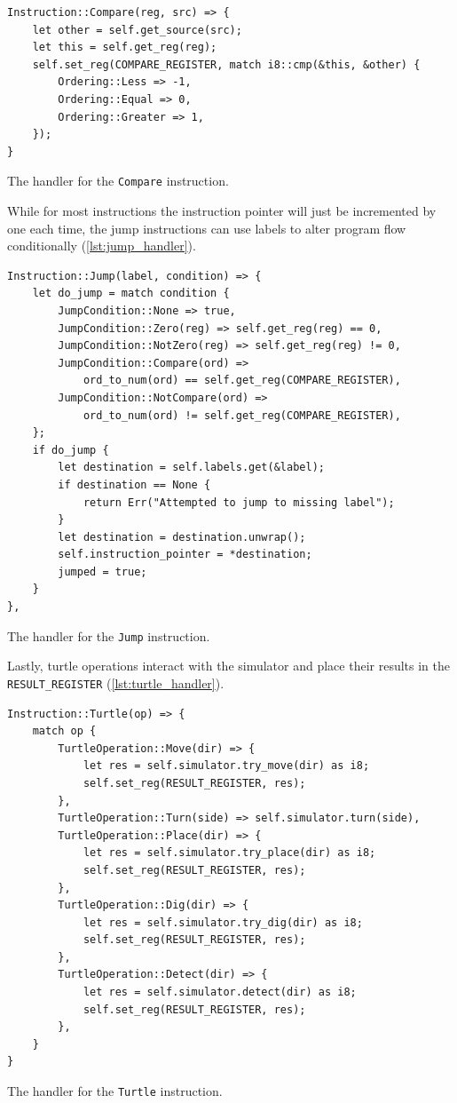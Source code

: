 \documentclass{report}
\newenvironment{code}{\captionsetup{type=listing}}{}
\begin{document}
\begin{code}
    \begin{verbatim}
Instruction::Compare(reg, src) => {
    let other = self.get_source(src);
    let this = self.get_reg(reg);
    self.set_reg(COMPARE_REGISTER, match i8::cmp(&this, &other) {
        Ordering::Less => -1,
        Ordering::Equal => 0,
        Ordering::Greater => 1,
    });
}
    \end{verbatim}
    \caption{The handler for the \texttt{Compare} instruction.}
    \label{lst:compare_handler}
\end{code}

While for most instructions the instruction pointer will just be incremented by one each time, the jump instructions can use labels to alter program flow conditionally (\autoref{lst:jump_handler}). 

\begin{code}
    \begin{verbatim}
Instruction::Jump(label, condition) => {
    let do_jump = match condition {
        JumpCondition::None => true,
        JumpCondition::Zero(reg) => self.get_reg(reg) == 0,
        JumpCondition::NotZero(reg) => self.get_reg(reg) != 0,
        JumpCondition::Compare(ord) =>
            ord_to_num(ord) == self.get_reg(COMPARE_REGISTER),
        JumpCondition::NotCompare(ord) =>
            ord_to_num(ord) != self.get_reg(COMPARE_REGISTER),
    };
    if do_jump {
        let destination = self.labels.get(&label);
        if destination == None {
            return Err("Attempted to jump to missing label");
        }
        let destination = destination.unwrap();
        self.instruction_pointer = *destination;
        jumped = true;
    }
},
    \end{verbatim}
    \caption{The handler for the \texttt{Jump} instruction.}
    \label{lst:jump_handler}
\end{code}

Lastly, turtle operations interact with the simulator and place their results in the \verb|RESULT_REGISTER| (\autoref{lst:turtle_handler}).

\begin{code}
    \begin{verbatim}
Instruction::Turtle(op) => {
    match op {
        TurtleOperation::Move(dir) => {
            let res = self.simulator.try_move(dir) as i8;
            self.set_reg(RESULT_REGISTER, res);
        },
        TurtleOperation::Turn(side) => self.simulator.turn(side),
        TurtleOperation::Place(dir) => {
            let res = self.simulator.try_place(dir) as i8;
            self.set_reg(RESULT_REGISTER, res);
        },
        TurtleOperation::Dig(dir) => {
            let res = self.simulator.try_dig(dir) as i8;
            self.set_reg(RESULT_REGISTER, res);
        },
        TurtleOperation::Detect(dir) => {
            let res = self.simulator.detect(dir) as i8;
            self.set_reg(RESULT_REGISTER, res);
        },
    }
}
    \end{verbatim}
    \caption{The handler for the \texttt{Turtle} instruction.}
    \label{lst:turtle_handler}
\end{code}
\end{document}
